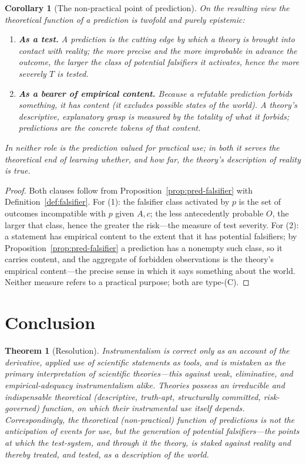 \documentclass{amsart}
\theoremstyle{definition}
\theoremstyle{plain}
\newtheorem{theorem}{Theorem}
\newtheorem{corollary}{Corollary}
\begin{document}
\begin{corollary}[The non-practical point of prediction]\label{cor:why-predict}
On the resulting view the theoretical function of a prediction is twofold and
purely epistemic:
\begin{enumerate}
\item \textbf{As a test.} A prediction is the cutting edge by which a theory is
brought into contact with reality; the more precise and the more
\emph{improbable in advance} the outcome, the larger the class of potential
falsifiers it activates, hence the more severely $T$ is tested.
\item \textbf{As a bearer of empirical content.} Because a refutable prediction
\emph{forbids} something, it has content (it excludes possible states of the
world). A theory's descriptive, explanatory grasp is measured by the totality of
what it forbids; predictions are the concrete tokens of that content.
\end{enumerate}
In neither role is the prediction valued for practical use; in both it serves
the theoretical end of learning whether, and how far, the theory's description
of reality is true.
\end{corollary}

\begin{proof}
Both clauses follow from Proposition~\ref{prop:pred-falsifier} with
Definition~\ref{def:falsifier}. For (1): the falsifier class activated by $p$ is
the set of outcomes incompatible with $p$ given $A,c$; the less antecedently
probable $O$, the larger that class, hence the greater the risk---the measure of
test severity. For (2): a statement has empirical content to the extent that it
has potential falsifiers; by Proposition~\ref{prop:pred-falsifier} a prediction
has a nonempty such class, so it carries content, and the aggregate of forbidden
observations is the theory's empirical content---the precise sense in which it
says something about the world. Neither measure refers to a practical purpose;
both are type-(C).
\end{proof}

\section{Conclusion}

\begin{theorem}[Resolution]\label{thm:resolution}
Instrumentalism is correct only as an account of the derivative, \emph{applied}
use of scientific statements as tools, and is \emph{mistaken} as the
\emph{primary} interpretation of scientific theories---this against weak,
eliminative, and empirical-adequacy instrumentalism alike. Theories possess an
irreducible and indispensable theoretical (descriptive, truth-apt, structurally
committed, risk-governed) function, on which their instrumental use itself
depends. Correspondingly, the theoretical (non-practical) function of
predictions is not the anticipation of events for use, but the generation of
potential falsifiers---the points at which the test-system, and through it the
theory, is staked against reality and thereby treated, and tested, as a
description of the world.
\end{theorem}
\end{document}
